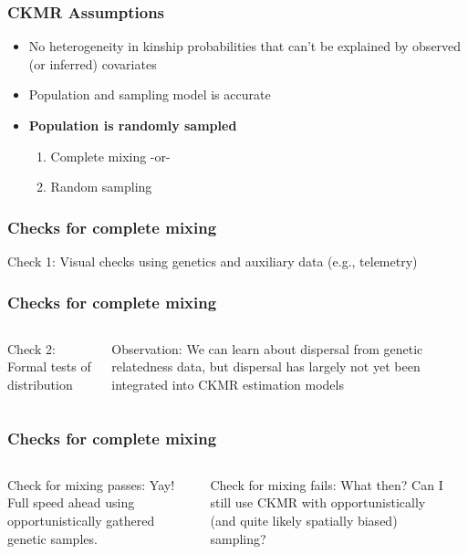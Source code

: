 \documentclass[serif,mathserif]{beamer}
\begin{document}
\begin{frame}
\frametitle{CKMR Assumptions}
\begin{itemize}
  \item No heterogeneity in kinship probabilities that can't be explained by observed (or inferred)
        covariates

  \item Population and sampling model is accurate

  \item \bf Population is randomly sampled
       \begin{enumerate}
         \item Complete mixing -or-
         \item Random sampling
       \end{enumerate}
       \rm
\end{itemize}
\end{frame}

\begin{frame}
\frametitle{Checks for complete mixing}
Check 1: Visual checks using genetics and auxiliary data (e.g., telemetry)

\vspace{0.5cm}

  \citet{HillaryEtAl2018}
\end{frame}

\begin{frame}
\frametitle{Checks for complete mixing}
  \begin{columns}[c]
  \column{2in}
   Check 2: Formal tests of distribution

   \vspace{1cm}
   Observation: We can learn about dispersal from genetic relatedness data, but dispersal has largely not yet been integrated into CKMR estimation models
  \column{2in}
  \end{columns}
\end{frame}

\begin{frame}
\frametitle{Checks for complete mixing}
  \begin{columns}[c]
  \column{2in}

  \textcolor{noaaturq}{Check for mixing passes}: Yay! Full speed ahead using opportunistically gathered genetic samples.

  \vspace{0.5cm}

  \textcolor{noaaturq}{Check for mixing fails}:  What then? Can I still use CKMR with opportunistically (and quite likely spatially biased) sampling?

    \column{2in}
  \citet{DiefenbachEtAl2005}
  \end{columns}

\end{frame}
\end{document}
